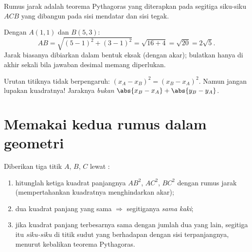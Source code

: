 \begin{omfigure}

{\small Rumus jarak adalah teorema Pythagoras yang diterapkan pada
segitiga siku-siku $ACB$ yang dibangun pada sisi mendatar dan sisi tegak.}
\end{omfigure}

\begin{example}\label{ex:g10:coordgeom:distance}
Dengan $A(1, 1)$ dan $B(5, 3)$:
\[
AB = \sqrt{(5-1)^2 + (3-1)^2} = \sqrt{16 + 4} = \sqrt{20} = 2\sqrt 5 .
\]
Jarak biasanya dibiarkan dalam bentuk eksak (dengan akar); bulatkan hanya
di akhir sekali bila jawaban desimal memang diperlukan.
\end{example}

\begin{remark}
Urutan titiknya tidak berpengaruh: $(x_A - x_B)^2 =
(x_B - x_A)^2$. Namun jangan lupakan kuadratnya! Jaraknya
\emph{bukan} $\abs{x_B - x_A} + \abs{y_B - y_A}$.
\end{remark}

\section{Memakai kedua rumus dalam geometri}

\begin{method}\label{met:g10:coordgeom:triangle}
Diberikan tiga titik $A$, $B$, $C$ lewat :
\begin{enumerate}
  \item hitunglah ketiga kuadrat panjangnya $AB^2$, $AC^2$, $BC^2$ dengan
        rumus jarak (mempertahankan kuadratnya menghindarkan akar);
  \item dua kuadrat panjang yang sama $\Rightarrow$ segitiganya
        \emph{sama kaki};
  \item jika kuadrat panjang terbesarnya sama dengan jumlah dua yang lain,
        segitiga itu \emph{siku-siku} di titik sudut yang berhadapan dengan
        sisi terpanjangnya, menurut kebalikan teorema Pythagoras.
\end{enumerate}
\end{method}

